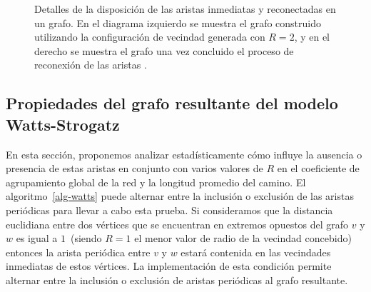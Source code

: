 \begin{figure}[!ht]
\begin{center}
\end{center}\vspace*{-0.6cm}
\caption[Detalles de la disposici\'on de las aristas inmediatas y reconectadas en el grafo]{Detalles de la disposici\'on de las aristas inmediatas y reconectadas en un grafo. En el diagrama izquierdo se muestra el grafo construido utilizando la configuraci\'on de vecindad generada con $R=2$, y en el derecho se muestra el grafo una vez concluido el proceso de reconexi\'on de las aristas \cite{viabarre2019}.}
\label{fig-grid-2D-reconected}
\end{figure}

\subsection{Propiedades del grafo resultante del modelo Watts-Strogatz}
\label{subsec-R-periodic}
En esta sección, proponemos analizar estadísticamente cómo influye la ausencia o presencia de estas aristas en conjunto con varios valores de $R$ en el coeficiente de agrupamiento global de la red y la longitud promedio del camino. El algoritmo~\ref{alg-watts} puede alternar entre la inclusión o exclusión de las aristas periódicas para llevar a cabo esta prueba. Si consideramos que la distancia euclidiana entre dos vértices que se encuentran en extremos opuestos del grafo $v$ y $w$ es igual a $1$~(siendo $R=1$ el menor valor de radio de la vecindad concebido) entonces la arista peri\'odica entre $v$ y $w$ estar\'a contenida en las vecindades inmediatas de estos v\'ertices. La implementación de esta condición permite alternar entre la inclusión o exclusión de aristas periódicas al grafo resultante.

